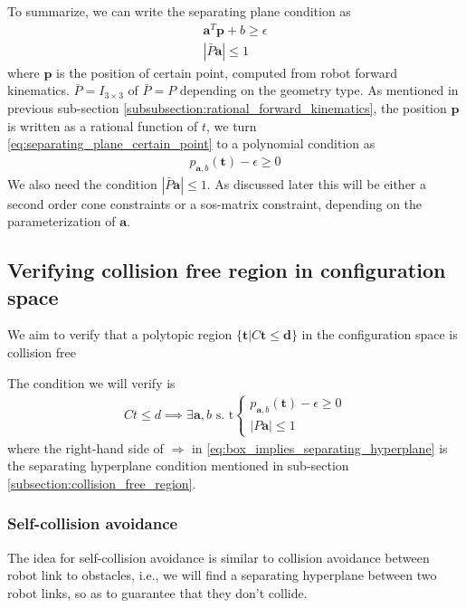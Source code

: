 \documentclass{article}
\renewcommand{\vec}[1]{\mathbf{#1}}
\begin{document}
To summarize, we can write the separating plane condition as
\begin{align}
	\vec{a}^T\vec{p} + b \ge \epsilon\label{eq:separating_plane_certain_point}\\
	|\bar{P}\vec{a}|\le 1
\end{align}
where $\vec{p}$ is the position of certain point, computed from robot forward kinematics. $\bar{P} = I_{3\times 3}$ of $\bar{P}=P$ depending on the geometry type. As mentioned in previous sub-section \ref{subsubsection:rational_forward_kinematics}, the position $\vec{p}$ is written as a rational function of $t$, we turn \eqref{eq:separating_plane_certain_point} to a polynomial condition as
\begin{align}
	p_{\vec{a}, b}(\vec{t}) -\epsilon\ge 0
\end{align}
We also need the condition $|\bar{P}\vec{a}|\le 1$. As discussed later this will be either a second order cone constraints or a sos-matrix constraint, depending on the parameterization of $\vec{a}$.

\subsection{Verifying collision free region in configuration space}
We aim to verify that a polytopic region $\{\vec{t} | C\vec{t}\le \vec{d}\}$ in the configuration space is collision free

The condition we will verify is
\begin{align}
	Ct\le d \implies\exists \vec{a}, b\text{ s. t}
	\begin{cases}
		p_{\vec{a}, b}(\vec{t}) - \epsilon \ge 0\\
		|P\vec{a}|\le 1
	\end{cases} \label{eq:box_implies_separating_hyperplane}
\end{align}
where the right-hand side of $\Rightarrow$ in \eqref{eq:box_implies_separating_hyperplane} is the separating hyperplane condition mentioned in sub-section \ref{subsection:collision_free_region}.

\subsubsection{Self-collision avoidance}
\label{subsubsection:self_collision_avoidance}
The idea for self-collision avoidance is similar to collision avoidance between robot link to obstacles, i.e., we will find a separating hyperplane between two robot links, so as to guarantee that they don't collide.
\end{document}
